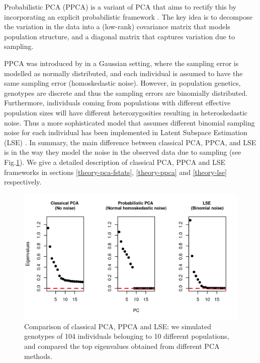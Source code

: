 \documentclass[12pt]{article}
\begin{document}
Probabilistic PCA (PPCA) is a variant of PCA that aims to rectify this by incorporating an explicit probabilistic framework \citep{tipping_probabilistic_1999-1}. The key idea is to decompose the variation in the data into a (low-rank) covariance matrix that models population structure, and a diagonal matrix that captures variation due to sampling.

PPCA was introduced by \citep{tipping_probabilistic_1999-1} in a Gaussian setting, where the sampling error is modelled as normally distributed, and each individual is assumed to have the same sampling error (homoskedastic noise). However, in population genetics, genotypes are discrete and thus the sampling errors are binomially distributed. Furthermore, individuals coming from populations with different effective population sizes will have different heterozygosities resulting in heteroskedastic noise. Thus a more sophisticated model that assumes different binomial sampling noise for each individual has been implemented in Latent Subspace Estimation (LSE) \citep{chen_consistent_2015, van_waaij_evaluation_2023, cabreros_likelihood-free_2019}. In summary, the main difference between classical PCA, PPCA, and LSE is in the way they model the noise in the observed data due to sampling (see Fig.\ref{fig1:pca_ppca}). We give a detailed description of classical PCA, PPCA and LSE frameworks in sections \ref{theory-pca-fstats}, \ref{theory-ppca} and \ref{theory-lse} respectively.  

\begin{figure}[ht!]
    \includegraphics[width=16.5cm]{Images/Figures/pca_all_genetic.png}
    \centering
    \caption{Comparison of classical PCA, PPCA and LSE: we simulated genotypes of 104 individuals belonging to 10 different populations, and compared the top eigenvalues obtained from different PCA methods.}
    \label{fig1:pca_ppca} 
\end{figure}
\end{document}
